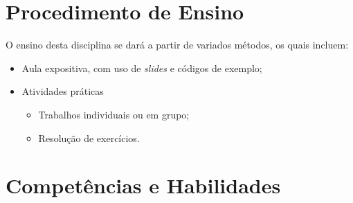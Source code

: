 \documentclass[a4paper, 12pt]{article}
\begin{document}
\section{Procedimento de Ensino}

O ensino desta disciplina se dará a partir de variados métodos, os quais incluem: 
\begin{itemize}
    \item Aula expositiva, com uso de \textit{slides} e códigos de exemplo;
    \item Atividades práticas
        \begin{itemize}
            \item Trabalhos individuais ou em grupo;
            \item Resolução de exercícios.
        \end{itemize}
\end{itemize}

\section{Competências e Habilidades}
\end{document}
